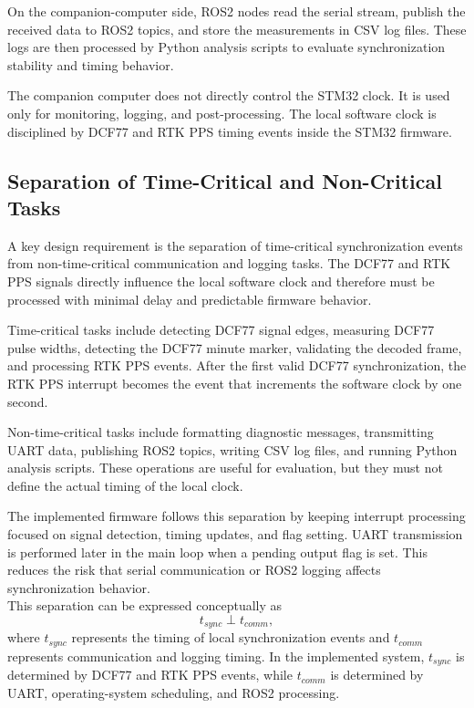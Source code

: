 On the companion-computer side, ROS2 nodes read the serial stream, publish the received data to ROS2 topics, and store the measurements in CSV log files. These logs are then processed by Python analysis scripts to evaluate synchronization stability and timing behavior.

The companion computer does not directly control the STM32 clock. It is used only for monitoring, logging, and post-processing. The local software clock is disciplined by DCF77 and RTK PPS timing events inside the STM32 firmware.

\subsection{Separation of Time-Critical and Non-Critical Tasks}

A key design requirement is the separation of time-critical synchronization events from non-time-critical communication and logging tasks. The DCF77 and RTK PPS signals directly influence the local software clock and therefore must be processed with minimal delay and predictable firmware behavior.

Time-critical tasks include detecting DCF77 signal edges, measuring DCF77 pulse widths, detecting the DCF77 minute marker, validating the decoded frame, and processing RTK PPS events. After the first valid DCF77 synchronization, the RTK PPS interrupt becomes the event that increments the software clock by one second.

Non-time-critical tasks include formatting diagnostic messages, transmitting UART data, publishing ROS2 topics, writing CSV log files, and running Python analysis scripts. These operations are useful for evaluation, but they must not define the actual timing of the local clock.

The implemented firmware follows this separation by keeping interrupt processing focused on signal detection, timing updates, and flag setting. UART transmission is performed later in the main loop when a pending output flag is set. This reduces the risk that serial communication or ROS2 logging affects synchronization behavior.
\\
This separation can be expressed conceptually as
\begin{equation}
t_{sync} \perp t_{comm},
\end{equation}
where $t_{sync}$ represents the timing of local synchronization events and $t_{comm}$ represents communication and logging timing. In the implemented system, $t_{sync}$ is determined by DCF77 and RTK PPS events, while $t_{comm}$ is determined by UART, operating-system scheduling, and ROS2 processing.

